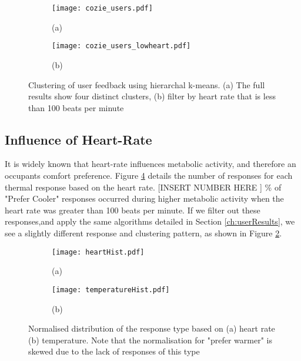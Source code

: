 

\begin{figure}
    \begin{subfigure}[t]{0.49\textwidth}  
    \centering
        \texttt{[image: cozie\_users.pdf]}
		\caption{(a)}
		\label{fig:userPlot}
    \end{subfigure}
    \begin{subfigure}[t]{0.49\textwidth}
    \centering
        \texttt{[image: cozie\_users\_lowheart.pdf]}
		\caption{(b)}
		\label{fig:lowHeartUsers}
    \end{subfigure}
    \caption{Clustering of user feedback using hierarchal k-means. (a) The full results show four distinct clusters, (b) filter by heart rate that is less than 100 beats per minute}
    \label{fig:clustering}
\end{figure}




\subsection{Influence of Heart-Rate}

It is widely known that heart-rate influences metabolic activity, and therefore an occupants comfort preference. Figure \ref{fig:heartHist} details the number of responses for each thermal response based on the heart rate. [INSERT NUMBER HERE ] \% of "Prefer Cooler" responses occurred during higher metabolic activity when the heart rate was greater than 100 beats per minute. If we filter out these responses,and apply the same algorithms detailed in Section \ref{ch:userResults}, we see a slightly different response and clustering pattern, as shown in Figure \ref{fig:lowHeartUsers}. 



\begin{figure}
    \begin{subfigure}[t]{0.49\textwidth}  
    \centering
	\texttt{[image: heartHist.pdf]}
	\caption{(a)}
	\label{fig:heartHist}
    \end{subfigure}
    \begin{subfigure}[t]{0.49\textwidth}
    \centering
		\texttt{[image: temperatureHist.pdf]}
		\caption{(b)}
		\label{fig:tempHist}	
    \end{subfigure}
    \caption{ Normalised distribution of the response type based on (a) heart rate (b) temperature. Note that the normalisation for "prefer warmer" is skewed due to the lack of responses of this type}
\end{figure}



